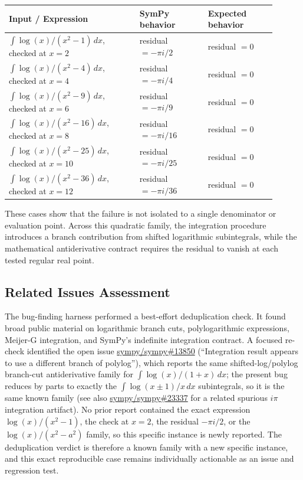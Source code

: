\documentclass[11pt]{article}
\begin{document}
\begin{center}
\renewcommand{\arraystretch}{1.3}
\begin{tabular}{@{}>{\raggedright\arraybackslash}p{0.44\linewidth}>{\raggedright\arraybackslash}p{0.23\linewidth}>{\raggedright\arraybackslash}p{0.23\linewidth}@{}}
\toprule
\textbf{Input / Expression} & \textbf{SymPy behavior} & \textbf{Expected behavior} \\
\midrule
\(\int \log(x)/(x^2-1)\,dx\), checked at \(x=2\) & residual \(=-\pi i/2\) & residual \(=0\) \\
\(\int \log(x)/(x^2-4)\,dx\), checked at \(x=4\) & residual \(=-\pi i/4\) & residual \(=0\) \\
\(\int \log(x)/(x^2-9)\,dx\), checked at \(x=6\) & residual \(=-\pi i/9\) & residual \(=0\) \\
\(\int \log(x)/(x^2-16)\,dx\), checked at \(x=8\) & residual \(=-\pi i/16\) & residual \(=0\) \\
\(\int \log(x)/(x^2-25)\,dx\), checked at \(x=10\) & residual \(=-\pi i/25\) & residual \(=0\) \\
\(\int \log(x)/(x^2-36)\,dx\), checked at \(x=12\) & residual \(=-\pi i/36\) & residual \(=0\) \\
\bottomrule
\end{tabular}
\end{center}

These cases show that the failure is not isolated to a single denominator or evaluation point. Across this quadratic family, the integration procedure introduces a branch contribution from shifted logarithmic subintegrals, while the mathematical antiderivative contract requires the residual to vanish at each tested regular real point.

\subsection{Related Issues Assessment}

The bug-finding harness performed a best-effort deduplication check. It found broad public material on logarithmic branch cuts, polylogarithmic expressions, Meijer-G integration, and SymPy's indefinite integration contract. A focused re-check identified the open issue \href{https://github.com/sympy/sympy/issues/13850}{sympy/sympy\#13850} (``Integration result appears to use a different branch of polylog''), which reports the same shifted-log/polylog branch-cut antiderivative family for \(\int \log(x)/(1+x)\,dx\); the present bug reduces by parts to exactly the \(\int \log(x\pm1)/x\,dx\) subintegrals, so it is the same known family (see also \href{https://github.com/sympy/sympy/issues/23337}{sympy/sympy\#23337} for a related spurious \(i\pi\) integration artifact). No prior report contained the exact expression \(\log(x)/(x^2-1)\), the check at \(x=2\), the residual \(-\pi i/2\), or the \(\log(x)/(x^2-a^2)\) family, so this specific instance is newly reported. The deduplication verdict is therefore a known family with a new specific instance, and this exact reproducible case remains individually actionable as an issue and regression test.
\end{document}
